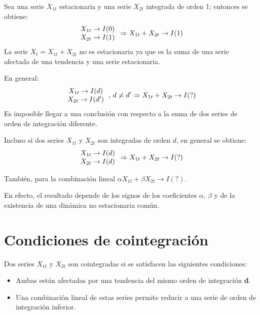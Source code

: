 Sea una serie $X_{1t}$ estacionaria y una serie $X_{2t}$ integrada de orden 1; entonces se obtiene:
\[
{\begin{array}{*{20}c}
X_{1t}\to I(0)\\
X_{2t}\to I(1)\\
\end{array} }\Rightarrow X_{1t}+X_{2t}\to I(1)
\]
La serie $X_{t}=X_{1t}+X_{2t}$ no es estacionaria ya que es la suma de una serie afectada de una tendencia y una serie estacionaria.\newline

En general:
\[
{\begin{array}{*{20}c}
X_{1t}\to I(d)\\
X_{2t}\to I(d')\\
\end{array} }\thinspace ,\thinspace d\ne d'\Rightarrow X_{1t}+X_{2t}\to 
I(?)
\]
Es imposible llegar a una conclusi\'{o}n con respecto a la suma de dos series de orden de integraci\'{o}n diferente.\newline

Incluso si dos series $X_{1t}$ y $X_{2t}$ son integradas de orden $d$, en general se obtiene:
\[
{\begin{array}{*{20}c}
X_{1t}\to I(d)\\
X_{2t}\to I(d)\\
\end{array} }\Rightarrow X_{1t}+X_{2t}\to I(?)
\]

Tambi\'{e}n, para la combinaci\'{o}n lineal $\alpha X_{1t}+\beta X_{2t}\to I(?)$.

En efecto, el resultado depende de los signos de los coeficientes $\alpha$, $\beta$ y de la existencia de una din\'{a}mica no estacionaria com\'{u}n.

\section{Condiciones de cointegraci\'{o}n}
Dos series $X_{1t}$ y $X_{2t}$ son cointegradas si se satisfacen las siguientes condiciones:
\begin{itemize}
      \item Ambas est\'{a}n afectadas por una tendencia del mismo orden de integraci\'{o}n \textbf{d}.
      \item Una combinaci\'{o}n lineal de estas series permite reducir a una serie de orden de integraci\'{o}n inferior.
\end{itemize}

